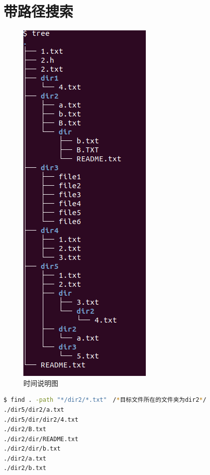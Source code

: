 \documentclass{article}
\begin{document}
\section{带路径搜索}
\begin{figure}[H]
	\centering
	\includegraphics[scale=0.6]{pic5.png} \par
	\caption{时间说明图}
\end{figure}
\begin{lstlisting}[language=bash]
$ find . -path "*/dir2/*.txt"　/*目标文件所在的文件夹为dir2*/
./dir5/dir2/a.txt
./dir5/dir/dir2/4.txt
./dir2/B.txt
./dir2/dir/README.txt
./dir2/dir/b.txt
./dir2/a.txt
./dir2/b.txt

\end{lstlisting}
\end{document}

